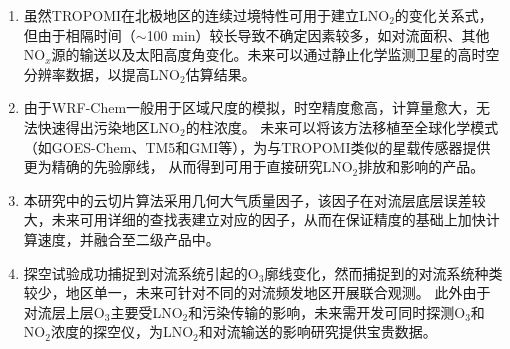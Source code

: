 \begin{enumerate}[label=（\arabic*）, labelindent=\parindent, leftmargin=0pt, widest=0, itemindent=*, topsep=0pt, partopsep=0pt, parsep=0pt]

\item 虽然TROPOMI在北极地区的连续过境特性可用于建立LNO$_2$的变化关系式，但由于相隔时间（$\sim$100 min）较长导致不确定因素较多，如对流面积、其他NO$_x$源的输送以及太阳高度角变化。未来可以通过静止化学监测卫星的高时空分辨率数据，以提高LNO$_2$估算结果。

\item 由于WRF-Chem一般用于区域尺度的模拟，时空精度愈高，计算量愈大，无法快速得出污染地区LNO$_2$的柱浓度。
未来可以将该方法移植至全球化学模式（如GOES-Chem、TM5和GMI等），为与TROPOMI类似的星载传感器提供更为精确的先验廓线，
从而得到可用于直接研究LNO$_2$排放和影响的产品。

\item 本研究中的云切片算法采用几何大气质量因子，该因子在对流层底层误差较大，未来可用详细的查找表建立对应的因子，从而在保证精度的基础上加快计算速度，并融合至二级产品中。

\item 探空试验成功捕捉到对流系统引起的O$_3$廓线变化，然而捕捉到的对流系统种类较少，地区单一，未来可针对不同的对流频发地区开展联合观测。
此外由于对流层上层O$_3$主要受LNO$_2$和污染传输的影响，未来需开发可同时探测O$_3$和NO$_2$浓度的探空仪，为LNO$_2$和对流输送的影响研究提供宝贵数据。

\end{enumerate}
